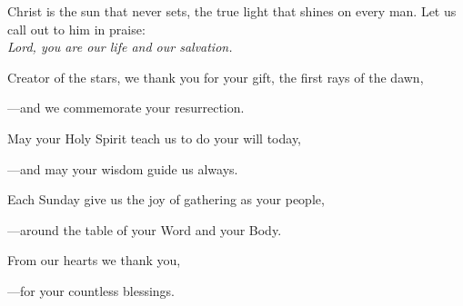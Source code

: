\intercessions\indent

\begin{hangpar}

Christ is the sun that never sets, the true light that shines on every man. Let us call out to him in praise:\\
\emph{Lord, you are our life and our salvation.}

\medskip Creator of the stars, we thank you for your gift, the first rays of the dawn,

{\color{red}---\thinspace}and we commemorate your resurrection.

\medskip May your Holy Spirit teach us to do your will today,

{\color{red}---\thinspace}and may your wisdom guide us always.

\medskip Each Sunday give us the joy of gathering as your people,

{\color{red}---\thinspace}around the table of your Word and your Body.

\medskip From our hearts we thank you,

{\color{red}---\thinspace}for your countless blessings.

\end{hangpar}

